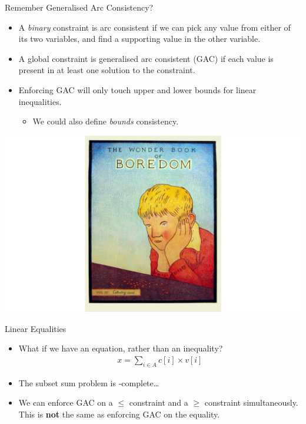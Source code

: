 \documentclass[aspectratio=169,compress,10pt]{beamer}
\begin{document}
\begin{frame}{Remember Generalised Arc Consistency?}
    \begin{minipage}{0.6\paperwidth}
    \begin{itemize}
        \item A \emph{binary} constraint is arc consistent if we can pick any value from either of its
            two variables, and find a supporting value in the other variable.
        \item A global constraint is generalised arc consistent (GAC) if each value
            is present in at least one solution to the constraint.
        \item Enforcing GAC will only touch upper and lower bounds for
            linear inequalities.
            \begin{itemize}
                \item We could also define \emph{bounds} consistency.
            \end{itemize}
    \end{itemize}
    \end{minipage}\begin{minipage}{0.4\paperwidth}
        \hspace*{-1cm}\includegraphics[keepaspectratio=true,scale=0.07]{bored.png}
    \end{minipage}
\end{frame}

\begin{frame}{Linear Equalities}
    \begin{itemize}
        \item What if we have an equation, rather than an inequality?
            \begin{align*}x = \sum_{i \in A}{c[i] \times v[i]}\end{align*}
        \item <2-> The subset sum problem is \NP-complete\ldots
        \item <3-> We can enforce GAC on a $\le$ constraint and a $\ge$
            constraint simultaneously. This is \textbf{not} the same as enforcing GAC
            on the equality.
    \end{itemize}
\end{frame}
\end{document}

